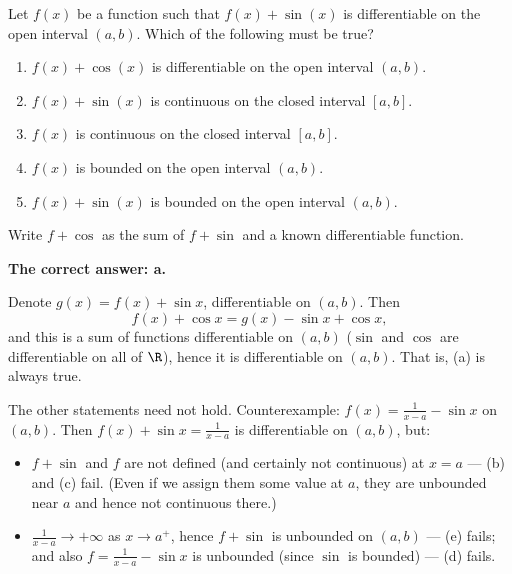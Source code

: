 
\begin{question}
Let $f(x)$ be a function such that $f(x)+\sin(x)$ is differentiable on the open interval $(a,b)$. Which of the following must be true?
\begin{enumerate}
  \item $f(x)+\cos(x)$ is differentiable on the open interval $(a,b)$.
  \item $f(x)+\sin(x)$ is continuous on the closed interval $[a,b]$.
  \item $f(x)$ is continuous on the closed interval $[a,b]$.
  \item $f(x)$ is bounded on the open interval $(a,b)$.
  \item $f(x)+\sin(x)$ is bounded on the open interval $(a,b)$.
\end{enumerate}
\end{question}

\begin{hint}
Write $f+\cos$ as the sum of $f+\sin$ and a known differentiable function.
\end{hint}

\begin{solution}
\textbf{The correct answer: a.}

Denote $g(x)=f(x)+\sin x$, differentiable on $(a,b)$. Then
\[ f(x)+\cos x=g(x)-\sin x+\cos x , \]
and this is a sum of functions differentiable on $(a,b)$ ($\sin$ and $\cos$ are differentiable on all of $\R$), hence it is differentiable on $(a,b)$. That is, (a) is always true.

The other statements need not hold. Counterexample: $f(x)=\frac{1}{x-a}-\sin x$ on $(a,b)$. Then $f(x)+\sin x=\frac{1}{x-a}$ is differentiable on $(a,b)$, but:
\begin{itemize}
  \item $f+\sin$ and $f$ are not defined (and certainly not continuous) at $x=a$ --- (b) and (c) fail. (Even if we assign them some value at $a$, they are unbounded near $a$ and hence not continuous there.)
  \item $\frac{1}{x-a}\to+\infty$ as $x\to a^+$, hence $f+\sin$ is unbounded on $(a,b)$ --- (e) fails; and also $f=\frac{1}{x-a}-\sin x$ is unbounded (since $\sin$ is bounded) --- (d) fails.
\end{itemize}
\end{solution}
